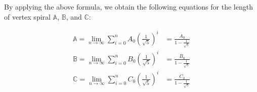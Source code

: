 \noindent
By applying the above formula, we obtain the following equations for the length of vertex spiral $\mathbb{A}$, $\mathbb{B}$, and $\mathbb{C}$:

\begin{equation}
    \begin{aligned}
        \mathbb{A} = \lim_{n \to \infty} \sum_{i=0}^{n} A_0\left(\frac{1}{\sqrt{5}}\right)^i &=\frac{A_0}{1-\frac{1}{\sqrt{5}}} \\
        \mathbb{B} = \lim_{n \to \infty} \sum_{i=0}^{n} B_0\left(\frac{1}{\sqrt{5}}\right)^i &=\frac{B_0}{1-\frac{1}{\sqrt{5}}} \\
        \mathbb{C} = \lim_{n \to \infty} \sum_{i=0}^{n} C_0\left(\frac{1}{\sqrt{5}}\right)^i &=\frac{C_0}{1-\frac{1}{\sqrt{5}}} \\
    \end{aligned}
\end{equation}
